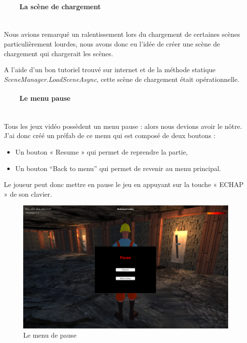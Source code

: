 \documentclass[titlepage, 13px, a4paper]{report}
\begin{document}
\paragraph{~~~~La scène de chargement} \hspace{0pt} \\
Nous avions remarqué un ralentissement lors du chargement de certaines scènes particulièrement lourdes, nous avons donc eu 
l’idée de créer une scène de chargement qui chargerait les scènes.

A l’aide d’un bon tutoriel trouvé sur internet et de la méthode statique \textit{SceneManager.LoadSceneAsync}, cette scène 
de chargement était opérationnelle. \\


\paragraph{~~~~Le menu pause} \hspace{0pt} \\
Tous les jeux vidéo possèdent un menu pause : alors nous devions avoir le nôtre.
J’ai donc créé un préfab de ce menu qui est composé de deux boutons : \\
{\begin{itemize}
	\item Un bouton « Resume » qui permet de reprendre la partie,
	\item Un bouton “Back to menu” qui permet de revenir au menu principal. \\
\end{itemize}}
Le joueur peut donc mettre en pause le jeu en appuyant sur la touche « ECHAP » de son clavier. \\

\begin{figure}[h!]
  \centering
  \includegraphics[scale=0.28]{images/cedric_pausemenu.png}
  \caption{Le menu de pause}
\end{figure}
\end{document}
